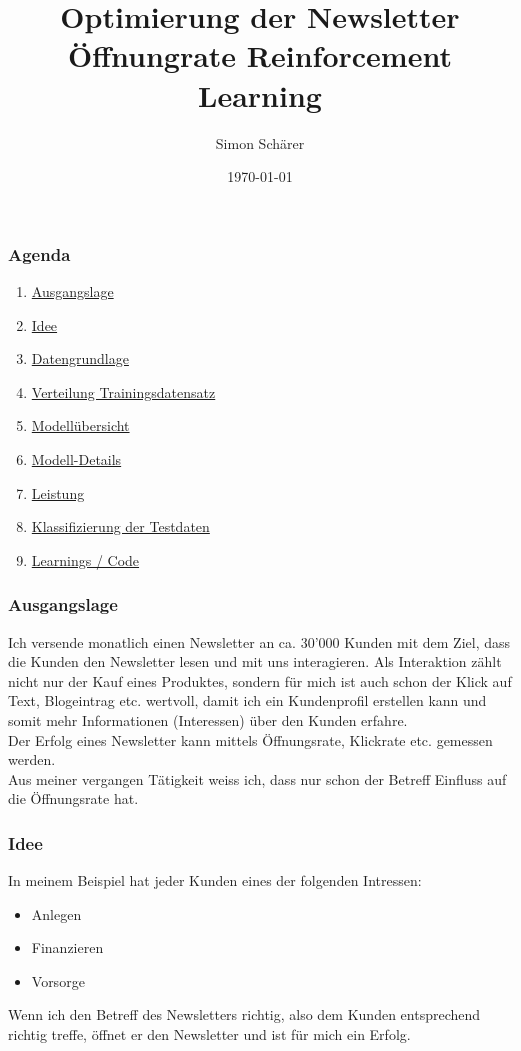 \documentclass{beamer}
\title{Optimierung der Newsletter Öffnungrate \newline
 Reinforcement Learning}
\author{Simon Schärer}
\date{\today}
\begin{document}
\frame{\titlepage}

\begin{frame}
  \frametitle{Agenda}

  \begin{enumerate}
    \item \hyperlink{sec1}{Ausgangslage}
    \item \hyperlink{sec2}{Idee}
    \item \hyperlink{sec3}{Datengrundlage}
    \item \hyperlink{sec4}{Verteilung Trainingsdatensatz}
    \item \hyperlink{sec5}{Modellübersicht}
    \item \hyperlink{sec6}{Modell-Details}
    \item \hyperlink{sec6}{Leistung}
    \item \hyperlink{sec7}{Klassifizierung der Testdaten}
    \item \hyperlink{sec8}{Learnings / Code}
  \end{enumerate}
\end{frame}


\begin{frame}  
\label{sec1}
	\frametitle{Ausgangslage}
Ich versende monatlich einen Newsletter an ca. 30'000 Kunden mit dem Ziel, dass die Kunden den Newsletter lesen und mit uns interagieren. Als Interaktion zählt nicht nur der Kauf eines Produktes, sondern für mich ist auch schon der Klick auf Text, Blogeintrag etc. wertvoll, damit ich ein Kundenprofil erstellen kann und somit mehr Informationen (Interessen) über den Kunden erfahre.
\\
[0.2cm] %
Der Erfolg eines Newsletter kann mittels Öffnungsrate, Klickrate etc. gemessen werden. 
\\
[0.2cm] %
Aus meiner vergangen Tätigkeit weiss ich, dass nur schon der Betreff Einfluss auf die Öffnungsrate hat.


\end{frame}

\begin{frame}  
	\label{sec2}
  	\frametitle{Idee}
 In meinem Beispiel hat jeder Kunden eines der folgenden Intressen:
	\begin{itemize}
	\item Anlegen
	\item Finanzieren
	\item Vorsorge
	\end{itemize}
\vspace{0.2cm}%
 Wenn ich den Betreff des Newsletters richtig, also dem Kunden entsprechend richtig treffe, öffnet er den Newsletter und ist für mich ein Erfolg.
 \end{frame}
\end{document}

